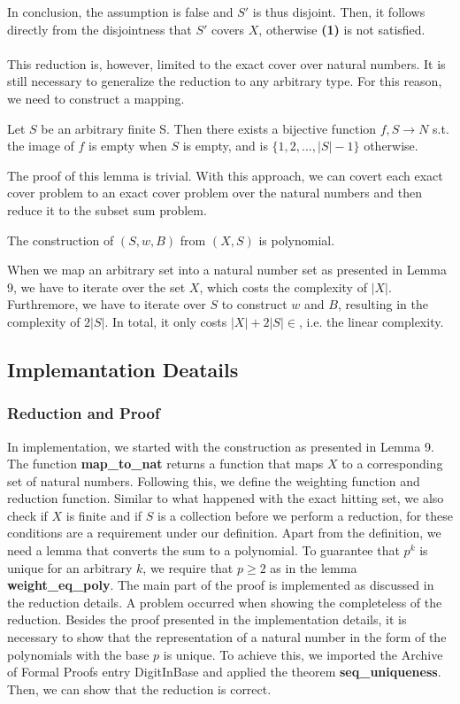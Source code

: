 In conclusion, the assumption is false and $S'$ is thus disjoint. Then, it follows directly from the disjointness that $S'$ covers $X$, otherwise \textbf{(1)}
is not satisfied. \\\\
This reduction is, however, limited to the exact cover over natural numbers. It is still necessary to generalize the reduction to any arbitrary type. For this reason,
we need to construct a mapping. 
\begin{lemma}
    Let $S$ be an arbitrary finite S. Then there exists a bijective function $f, S \rightarrow N$ s.t. the image of $f$ is empty when $S$ is empty, 
    and is $\{1, 2, ..., |S| - 1\}$ otherwise.
\end{lemma}
The proof of this lemma is trivial. With this approach, we can covert each exact cover problem to an exact cover problem over the natural numbers and then 
reduce it to the subset sum problem. 
\begin{lemma}
    The construction of $(S, w, B)$ from $(X, S)$ is polynomial. 
\end{lemma}
When we map an arbitrary set into a natural number set as presented in Lemma 9, we have to iterate over the set $X$, which costs the complexity of $|X|$. 
Furthremore, we have to iterate over $S$ to construct $w$ and $B$, resulting in the complexity of $2|S|$. In total, it only costs $|X| + 2|S| \in$, 
i.e. the linear complexity. 

\subsection{Implemantation Deatails}
\subsubsection{Reduction and Proof}
In implementation, we started with the construction as presented in Lemma 9. The function \textbf{map\_to\_nat} returns 
a function that maps $X$ to a corresponding set of natural numbers. Following this, we define the weighting function and 
reduction function. Similar to what happened with the exact hitting set, we also check if $X$ is finite and if $S$ is 
a collection before we perform a reduction, for these conditions are a requirement under our definition. 
Apart from the definition, we need a lemma that converts the sum to a polynomial. To guarantee that $p^k$ is unique for an arbitrary $k$, 
we require that $p \geq 2$ as in the lemma \textbf{weight\_eq\_poly}.
The main part of the proof is implemented as discussed in the reduction details. A problem occurred when showing the completeless of the reduction. 
Besides the proof presented in the implementation details, it is necessary to show that the representation of a natural number in the form 
of the polynomials with the base $p$ is unique. To achieve this, we imported the Archive of Formal Proofs entry DigitInBase and applied the theorem 
\textbf{seq\_uniqueness}.
Then, we can show that the reduction is correct.


